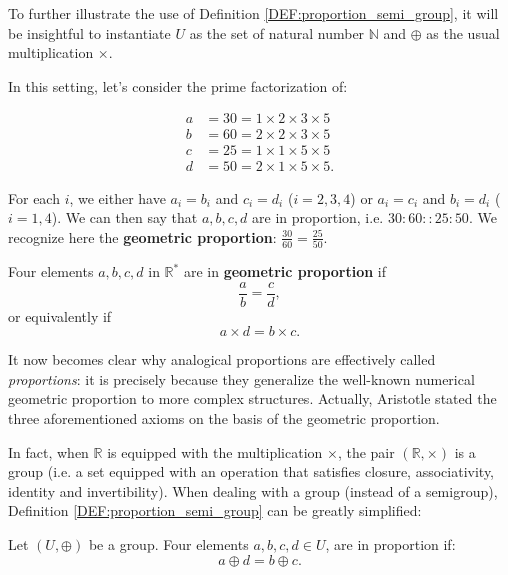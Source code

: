 To further illustrate the use of Definition \ref{DEF:proportion_semi_group}, it
will be insightful to instantiate $U$ as the set of natural number $\mathbb{N}$
and $\oplus$ as the usual multiplication $\times$.
\begin{testexample}
  In this setting, let's consider the prime factorization of:

  \begin{align*}
    a &= 30 = 1 \times 2 \times 3 \times 5\\
    b &= 60 = 2 \times 2 \times 3 \times 5\\
    c &= 25 = 1 \times 1 \times 5 \times 5\\
    d &= 50 = 2 \times 1 \times 5 \times 5.
  \end{align*}

For each $i$, we either have $a_i = b_i$ and $c_i = d_i$ ($i = 2, 3, 4$) or
$a_i = c_i$ and $b_i = d_i$ ($i = 1, 4$). We can then say that $a, b, c, d$ are
in proportion, i.e. $30: 60 :: 25: 50$. We recognize here the \textbf{geometric
  proportion}: $\frac{30}{60} = \frac{25}{50}$.
\end{testexample}

\begin{definition}
  Four elements $a, b, c, d$ in $\mathbb{R}^*$ are in \textbf{geometric
  proportion} if
  $$\frac{a}{b} = \frac{c}{d},$$
  or equivalently if
  $$a\times d = b\times c.$$
\end{definition}

It now becomes clear why analogical proportions are effectively called
\textit{proportions}: it is precisely because they generalize the well-known
numerical geometric proportion to more complex structures.  Actually, Aristotle
stated the three aforementioned axioms on the basis of the geometric
proportion.

In fact, when $\mathbb{R}$ is equipped with the multiplication $\times$, the
pair $(\mathbb{R}, \times)$ is a group (i.e. a set equipped with an operation
that satisfies  closure, associativity, identity and invertibility). When
dealing with a group (instead of a semigroup), Definition
\ref{DEF:proportion_semi_group} can be greatly simplified:

\begin{proposition}
  \label{PROP:proportion_group}
Let $(U, \oplus)$ be a group.  Four elements $a, b, c, d \in U$, are in
  proportion if:
  $$a \oplus d = b \oplus c.$$
\end{proposition}


